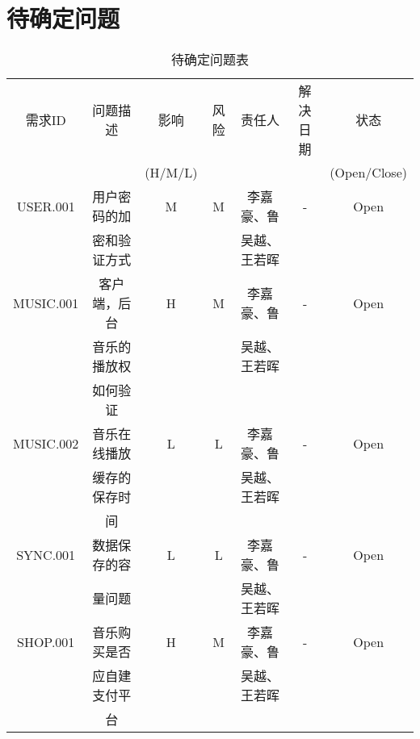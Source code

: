 \chapter{待确定问题}
\begin{table}[htbp]
\centering
\caption{待确定问题表} \label{tab:tbd_problems}
\begin{tabular}{|c|c|c|c|c|c|c|}
    \hline
    需求ID & 问题描述 & 影响    & 风险 & 责任人 & 解决日期 & 状态 \\
           &          & (H/M/L) &      &        &          & (Open/Close) \\
    \hline
    USER.001 & 用户密码的加 & M & M & 李嘉豪、鲁    & - & Open\\
             & 密和验证方式 &   &   & 吴越、王若晖  &   &\\
    \hline
    MUSIC.001 & 客户端，后台    & H & M & 李嘉豪、鲁    & - & Open\\
              & 音乐的播放权    &   &   & 吴越、王若晖  &   &\\
              & 如何验证        &   &   &               &   &\\
    \hline
    MUSIC.002 & 音乐在线播放    & L & L & 李嘉豪、鲁    & - & Open\\
              & 缓存的保存时    &   &   & 吴越、王若晖  &   &   \\
              & 间              &   &   &               &   &   \\
    \hline
    SYNC.001 & 数据保存的容 & L & L & 李嘉豪、鲁    & - & Open\\
             & 量问题       &   &   & 吴越、王若晖  &   & \\
    \hline
    SHOP.001 & 音乐购买是否 & H & M & 李嘉豪、鲁    & - & Open\\
             & 应自建支付平 &   &   & 吴越、王若晖  &   &\\
             & 台           &   &   &               &   &\\
    \hline
\end{tabular}
\end{table}